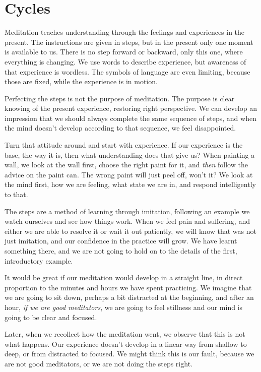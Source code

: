 \hypertarget{cycles-1}{%
\chapter{Cycles}\label{cycles-1}}

Meditation teaches understanding through the feelings and experiences in
the present. The instructions are given in steps, but in the present
only one moment is available to us. There is no step forward or
backward, only this one, where everything is changing. We use words to
describe experience, but awareness of that experience is wordless. The
symbols of language are even limiting, because those are fixed, while
the experience is in motion.

Perfecting the steps is not the purpose of meditation. The purpose is
clear knowing of the present experience, restoring right perspective. We
can develop an impression that we should always complete the same
sequence of steps, and when the mind doesn't develop according to that
sequence, we feel disappointed.

Turn that attitude around and start with experience. If our experience
is the base, the way it is, then what understanding does that give us?
When painting a wall, we look at the wall first, choose the right paint
for it, and \emph{then} follow the advice on the paint can. The wrong
paint will just peel off, won't it? We look at the mind first, how we
are feeling, what state we are in, and respond intelligently to that.

The steps are a method of learning through imitation, following an
example we watch ourselves and see how things work. When we feel pain
and suffering, and either we are able to resolve it or wait it out
patiently, we will know that was not just imitation, and our confidence
in the practice will grow. We have learnt something there, and we are
not going to hold on to the details of the first, introductory example.

It would be great if our meditation would develop in a straight line, in
direct proportion to the minutes and hours we have spent practicing. We
imagine that we are going to sit down, perhaps a bit distracted at the
beginning, and after an hour, \emph{if we are good meditators}, we are
going to feel stillness and our mind is going to be clear and focused.

Later, when we recollect how the meditation went, we observe that this
is not what happens. Our experience doesn't develop in a linear way from
shallow to deep, or from distracted to focused. We might think this is
our fault, because we are not good meditators, or we are not doing the
steps right.

